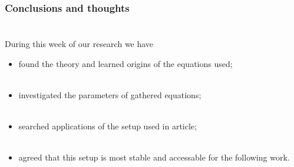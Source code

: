 \frametitle{Conclusions and thoughts}

\begin{equation*}
	\phantom{239}
\end{equation*}

During this week of our research we have
\begin{itemize}
	\item found the theory and learned origins of the equations used;\\
	\phantom{239}\\
	\item investigated the parameters of gathered equations;\\
	\phantom{239}\\
	\item searched applications of the setup used in article;\\
	\phantom{239}\\
	\item agreed that this setup is most stable and accessable for the following work.
\end{itemize}